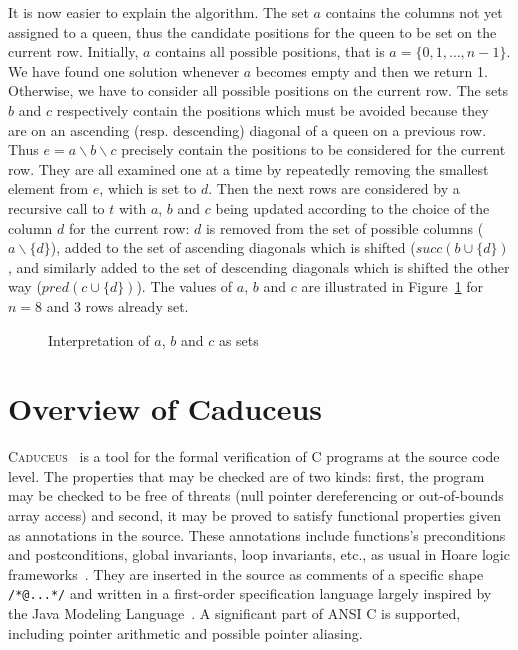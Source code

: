 \documentclass[a4paper]{llncs}
\newcommand{\caduceus}{\textsc{Caduceus}}
\begin{document}
It is now easier to explain the algorithm. The set $a$ contains the
columns not yet assigned to a queen, thus the candidate positions
for the queen to be set on the current row. Initially, $a$ contains
all possible positions, that is  $a = \{0,1,\dots,n-1\}$. 
We have found one solution whenever $a$ becomes empty and then we return 1.
Otherwise, we have to consider all possible positions on the current
row. The sets $b$ and $c$ respectively contain the positions which
must be avoided because they are on an ascending (resp. descending)
diagonal of a queen on a previous row.
Thus $e = a\backslash b\backslash c$ precisely contain the positions to be
considered for the current row. They are all examined one at a time by
repeatedly removing the smallest element from $e$, which is set to $d$.
Then the next rows are considered by a recursive call to $t$ with $a$,
$b$ and $c$ being updated according to the choice of the column $d$
for the current row: $d$ is removed from the set of possible columns
($a\backslash\{d\}$), added to the set of ascending diagonals which is
shifted ($\mathit{succ}(b\cup\{d\})$, and similarly  added to the set of
descending diagonals which is shifted the other way
($\mathit{pred}(c\cup\{d\})$). 
The values of $a$, $b$ and $c$ are illustrated in Figure~\ref{fig:abc}
for $n=8$ and 3 rows already set.

\begin{figure}[t]
  \hspace*{-3em}
  \caption{Interpretation of $a$, $b$ and $c$ as sets}
  \label{fig:abc}
\end{figure}

\section{Overview of Caduceus}\label{caduceus}

\caduceus~\cite{caduceus,FilliatreMarche04} is a tool for the
formal verification of C programs at the source code level.
The properties that may be checked are of two kinds: first, the
program may be checked to be free of threats (null pointer
dereferencing or out-of-bounds array access) and second, it may be
proved to satisfy functional properties given as annotations in the
source. These annotations include functions's preconditions and
postconditions, global invariants, loop invariants, etc., as usual in
Hoare logic frameworks~\cite{Hoare69}.
They are inserted in the source as comments of
a specific shape \texttt{/*@...*/} and written in a first-order specification
language largely inspired by the Java Modeling Language~\cite{JML}.
A significant part of ANSI C is supported, including pointer
arithmetic and possible pointer aliasing.
\end{document}
